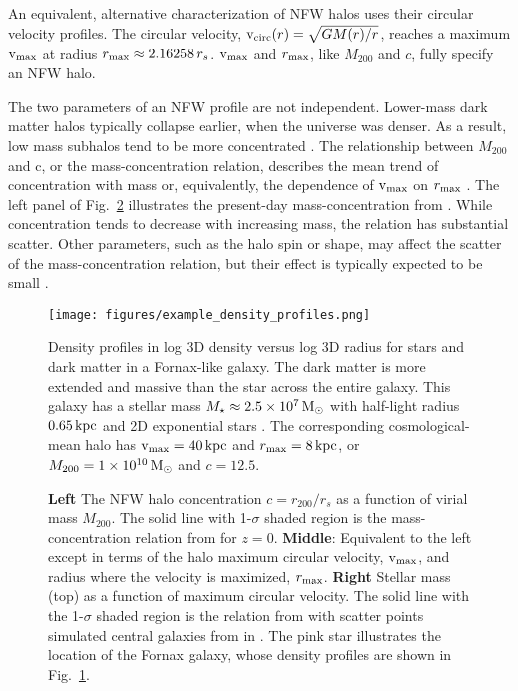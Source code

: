 An equivalent, alternative characterization of NFW halos uses their
circular velocity profiles. The circular velocity,
\({\rm v}_{\rm circ}(r) = \sqrt{G M(r) / r}\), reaches a maximum \({\rm v}_{\rm max}\) at radius
\(r_{\rm max} \approx 2.16258\,r_s\). \({\rm v}_{\rm max}\) and \(r_{\rm max}\), like
\(M_{200}\) and \(c\), fully specify an NFW halo.

The two parameters of an NFW profile are not independent. Lower-mass
dark matter halos typically collapse earlier, when the universe was
denser. As a result, low mass subhalos tend to be more concentrated
\citep[e.g.,][]{NFW1997}. The relationship between \(M_{200}\) and c, or
the mass-concentration relation, describes the mean trend of
concentration with mass or, equivalently, the dependence of \({\rm v}_{\rm max}\) on
\(r_{\rm max}\) \citep[e.g.,][]{bullock+2001, ludlow+2016}. The left panel of
Fig.~\ref{fig:smhm} illustrates the present-day mass-concentration from
\citet{ludlow+2016}. While concentration tends to decrease with
increasing mass, the relation has substantial scatter. Other parameters,
such as the halo spin or shape, may affect the scatter of the
mass-concentration relation, but their effect is typically expected to
be small \citep{navarro+2010, dicintio+2013, dutton+maccio2014}.

\begin{figure}
\centering
\texttt{[image: figures/example\_density\_profiles.png]}
\caption[Example dark matter and stellar density profiles]{Density
profiles in log 3D density versus log 3D radius for stars and dark
matter in a Fornax-like galaxy. The dark matter is more extended and
massive than the star across the entire galaxy. This galaxy has a
stellar mass \(M_\star \approx 2.5\times10^7\,{\rm M}_{\odot}\) with half-light
radius \(0.65\,{\rm kpc}\) and 2D exponential stars \citep[based
on,][]{munoz+2018, woo+courteau+dekel2008}. The corresponding
cosmological-mean halo has \({\rm v}_{\rm max}=40\,{\rm kpc}\) and \(r_{\rm max}=8\,{\rm kpc}\), or
\(M_{200} = 1\times10^{10}\,{\rm M}_{\odot}\) and
\(c=12.5\).}\label{fig:nfw_density}
\end{figure}

\begin{figure}
\centering
{}
\caption[Cosmological mass-concentration and stellar mass-halo mass
relations]{\textbf{Left} The NFW halo concentration \(c=r_{200} / r_s\)
as a function of virial mass \(M_{200}\). The solid line with
1-\(\sigma\) shaded region is the mass-concentration relation from
\citet{ludlow+2016} for \(z=0\). \textbf{Middle}: Equivalent to the left
except in terms of the halo maximum circular velocity, \({\rm v}_{\rm max}\), and
radius where the velocity is maximized, \(r_{\rm max}\). \textbf{Right}
Stellar mass (top) as a function of maximum circular velocity. The solid
line with the 1-\(\sigma\) shaded region is the relation from
\citet{fattahi+2018} with scatter points simulated central galaxies from
\apostle{} in \citet{fattahi+2018}. The pink star illustrates the
location of the Fornax galaxy, whose density profiles are shown in
Fig.~\ref{fig:nfw_density}.}\label{fig:smhm}
\end{figure}


